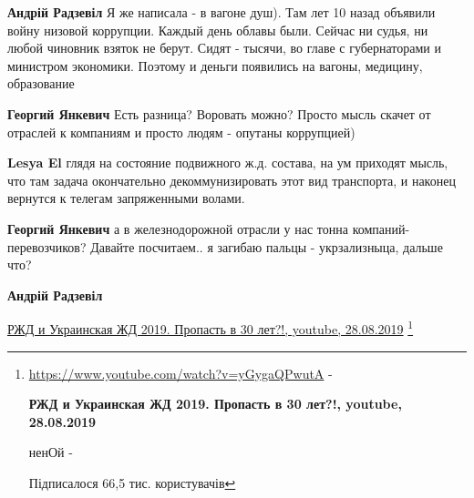 \begin{itemize}
\begin{itemize}
\textbf{Андрій Радзевіл} Я же написала - в вагоне душ). Там лет 10 назад объявили войну низовой коррупции. Каждый день облавы были. Сейчас ни судья, ни любой чиновник взяток не берут. Сидят - тысячи, во главе с губернаторами и министром экономики. Поэтому и деньги появились на вагоны, медицину, образование

 
\textbf{Георгий Янкевич} Есть разница? Воровать можно? Просто мысль скачет от отраслей к компаниям и просто людям - опутаны коррупцией)

 
\textbf{Lesya El} глядя на состояние подвижного ж.д. состава, на ум приходят мысль, что там задача окончательно декоммунизировать этот вид транспорта, и наконец вернутся к телегам запряженными волами.


 
\textbf{Георгий Янкевич} а в железнодорожной отрасли у нас тонна компаний-перевозчиков? Давайте посчитаем.. я загибаю пальцы - укрзализныца, дальше что?

 
\textbf{Андрій Радзевіл}

\href{https://www.youtube.com/watch?v=yGygaQPwutA}{РЖД и Украинская ЖД 2019. Пропасть в 30 лет?!, youtube, 28.08.2019}
\footnote{

\url{https://www.youtube.com/watch?v=yGygaQPwutA} - \par
{\bfseries РЖД и Украинская ЖД 2019. Пропасть в 30 лет?!, youtube, 28.08.2019}

ненОй - 

Підписалося 66,5 тис. користувачів

}
\end{itemize}
\end{itemize}
